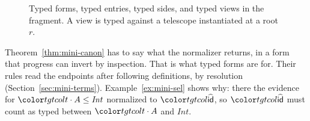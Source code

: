 \begin{figure}[t]
\small
\color{tgtcol}
\color{black}
\caption{Typed forms, typed entries, typed sides, and typed views in the fragment. A view is typed against a telescope instantiated at a root $r$.}
\label{fig:mini-formtyped}
\end{figure}

Theorem~\ref{thm:mini-canon} has to say what the normalizer returns, in a form that progress can invert by inspection. That is what typed forms are for. Their rules read the endpoints after following definitions, by resolution (Section~\ref{sec:mini-terms}). Example~\ref{ex:mini-sel} shows why: there the evidence for $\sel{t}{A} \le \mathit{Int}$ normalized to $\form{id}$, so $\form{id}$ must count as typed between $\sel{t}{A}$ and $\mathit{Int}$.

